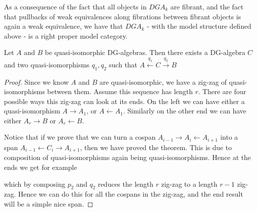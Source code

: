 As a consequence of the fact that all objects in $DGA_k$ are fibrant, and the fact that pullbacks of weak equivalences along fibrations between fibrant objects is again a weak equivalence, we have that $DGA_k$ - with the model structure defined above - is a right proper model category.  

\begin{theorem}
\label{thm:span}
Let $A$ and $B$ be quasi-isomorphic DG-algebras. Then there exists a DG-algebra $C$ and two quasi-isomorphisms $q_1, q_2$ such that $A\overset{q_1}\longleftarrow C \overset{q_2}\longrightarrow B$
\end{theorem}
\begin{proof}
Since we know $A$ and $B$ are quasi-isomorphic, we have a zig-zag of quasi-isomorphisms between them. Assume this sequence has length $r$. There are four possible ways this zig-zag can look at its ends. On the left we can have either a quasi-isomorphism $A\longrightarrow A_1$, or $A\longleftarrow A_1$. Similarly on the other end we can have either $A_r\longrightarrow B$ or $A_r\longleftarrow B$. 

Notice that if we prove that we can turn a cospan $A_{i-1}\longrightarrow A_i\longleftarrow A_{i+1}$ into a span $A_{i-1}\longleftarrow C_i \longrightarrow A_{i+1}$, then we have proved the theorem. This is due to composition of quasi-isomorphisms again being quasi-isomorphisms. Hence at the ends we get for example
\begin{center}
\end{center}
which by composing $p_2$ and $q_2$ reduces the length $r$ zig-zag to a length $r-1$ zig-zag. Hence we can do this for all the cospans in the zig-zag, and the end result will be a simple nice span. 


\end{proof}
